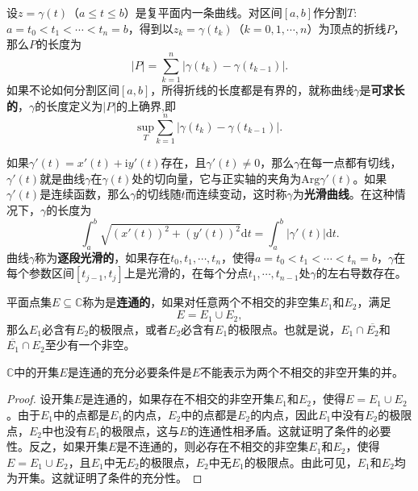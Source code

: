 \documentclass[../../main.tex]{subfiles}%
\begin{document}
\begin{definition}\label{definition:复平面上的光滑曲线}
设\(z = \gamma(t)\)（\(a \leqslant t \leqslant b\)）是复平面内一条曲线。对区间\([a, b]\)作分割$T:$ \(a = t_0 < t_1 < \cdots < t_n = b\)，得到以\(z_k = \gamma(t_k)\)（\(k = 0, 1, \cdots, n\)）为顶点的折线\(P\)，那么\(P\)的长度为
\[
|P| = \sum_{k = 1}^n | \gamma(t_k) - \gamma(t_{k - 1}) |.
\]
如果不论如何分割区间\([a, b]\)，所得折线的长度都是有界的，就称曲线\(\gamma\)是\textbf{可求长的}，\(\gamma\)的长度定义为\(|P|\)的上确界,即$$\underset{T}{\mathrm{sup}}\sum_{k=1}^n{|\gamma (t_k)}-\gamma (t_{k-1})|.$$

如果\(\gamma'(t) = x'(t) + \mathrm{i}y'(t)\)存在，且\(\gamma'(t) \neq 0\)，那么\(\gamma\)在每一点都有切线，\(\gamma'(t)\)就是曲线\(\gamma\)在\(\gamma(t)\)处的切向量，它与正实轴的夹角为\(\mathrm{Arg}\gamma'(t)\)。如果\(\gamma'(t)\)是连续函数，那么\(\gamma\)的切线随\(t\)而连续变动，这时称\(\gamma\)为\textbf{光滑曲线}。在这种情况下，\(\gamma\)的长度为
\[
\int_a^b \sqrt{(x'(t))^2 + (y'(t))^2} \mathrm{d}t = \int_a^b | \gamma'(t) | \mathrm{d}t.
\]
曲线\(\gamma\)称为\textbf{逐段光滑的}，如果存在\(t_0, t_1, \cdots, t_n\)，使得\(a = t_0 < t_1 < \cdots < t_n = b\)，\(\gamma\)在每个参数区间\([t_{j - 1}, t_j]\)上是光滑的，在每个分点\(t_1, \cdots, t_{n - 1}\)处\(\gamma\)的左右导数存在。
\end{definition}

\begin{definition}
平面点集\(E\subseteq \mathbb{C}\)称为是\textbf{连通的}，如果对任意两个不相交的非空集\(E_1\)和\(E_2\)，满足
\[
E = E_1 \cup E_2,
\]
那么\(E_1\)必含有\(E_2\)的极限点，或者\(E_2\)必含有\(E_1\)的极限点。也就是说，\(E_1 \cap \overline{E_2}\)和\(\overline{E_1} \cap E_2\)至少有一个非空。
\end{definition}

\begin{proposition}\label{proposition:集合连通的条件}
\(\mathbb{C}\)中的开集\(E\)是连通的充分必要条件是\(E\)不能表示为两个不相交的非空开集的并。
\end{proposition}
\begin{proof}
设开集\(E\)是连通的，如果存在不相交的非空开集\(E_1\)和\(E_2\)，使得\(E = E_1 \cup E_2\)。由于\(E_1\)中的点都是\(E_1\)的内点，\(E_2\)中的点都是\(E_2\)的内点，因此\(E_1\)中没有\(E_2\)的极限点，\(E_2\)中也没有\(E_1\)的极限点，这与\(E\)的连通性相矛盾。这就证明了条件的必要性。反之，如果开集\(E\)是不连通的，则必存在不相交的非空集\(E_1\)和\(E_2\)，使得\(E = E_1 \cup E_2\)，且\(E_1\)中无\(E_2\)的极限点，\(E_2\)中无\(E_1\)的极限点。由此可见，\(E_1\)和\(E_2\)均为开集。这就证明了条件的充分性。 
\end{proof}
\end{document}
